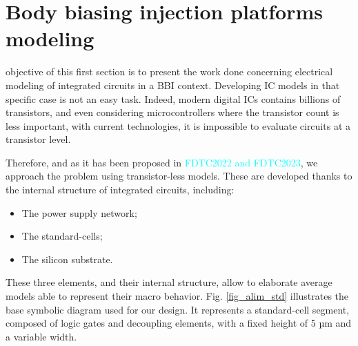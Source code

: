 
\section{Body biasing injection platforms modeling}
 objective of this first section is to present the work done concerning electrical modeling of integrated circuits in a BBI context.
Developing IC models in that specific case is not an easy task.
Indeed, modern digital ICs contains billions of transistors, and even considering microcontrollers where the transistor count is less important, with current technologies, it is impossible to evaluate circuits at a transistor level.

Therefore, and as it has been proposed in \textcolor{cyan}{FDTC2022 and FDTC2023}, we approach the problem using transistor-less models.
These are developed thanks to the internal structure of integrated circuits, including:
\begin{itemize}
	\item The power supply network;
	\item The standard-cells;
	\item The silicon substrate.
\end{itemize}
These three elements, and their internal structure, allow to elaborate average models able to represent their macro behavior.
Fig. \ref{fig_alim_std} illustrates the base symbolic diagram used for our design.
It represents a standard-cell segment, composed of logic gates and decoupling elements, with a fixed height of 5 µm and a variable width.

%







